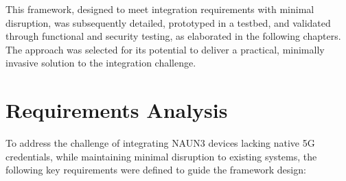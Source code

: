 This framework, designed to meet integration requirements with minimal disruption, was subsequently detailed, prototyped in a testbed, and validated through functional and security testing, as elaborated in the following chapters. The approach was selected for its potential to deliver a practical, minimally invasive solution to the integration challenge.

\section{Requirements Analysis}

To address the challenge of integrating \ac{NAUN3} devices lacking native \ac{5G} credentials, while maintaining minimal disruption to existing systems, the following key requirements were defined to guide the framework design:

